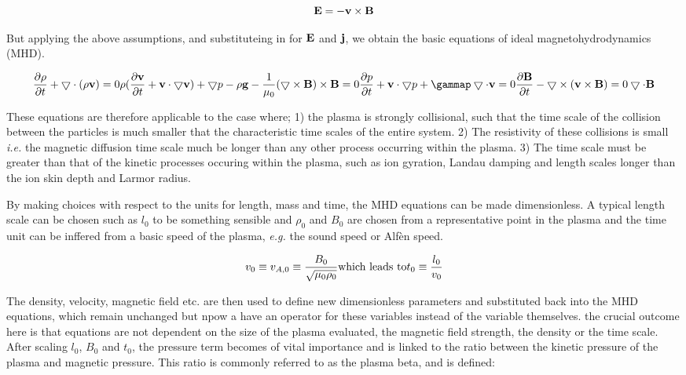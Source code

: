 \begin{equation}
	\mathbf{E} = -\mathbf{v} \times \mathbf{B}
\end{equation}

But applying the above assumptions, and substituteing in for $\mathbf{E}$ and $\mathbf{j}$, we obtain the basic equations of ideal magnetohydrodynamics (MHD).

\begin{equation}
	\pd{\rho}{t} + \del\cdot(\rho\mb{v}) = 0
	
	\rho(\pd{\mb{v}}{t} + \mb{v}\cdot\divv{\mb{v}}) + \divv{p} - \rho\mb{g} - \frac{1}{\mu_0}(\del \times \mb{B}) \times \mb{B} = 0
	
	\pd{p}{t} + \mb{v}\cdot\divv{p} + \gammap\del\cdot\mb{v} = 0
	
	\pd{\mb{B}}{t} - \del \times (\mb{v} \times \mb{B}) = 0
	
	\del\cdot\mb{B}
\end{equation}

These equations are therefore applicable to the case where; 1) the plasma is strongly collisional, such that the time scale of the collision between the particles is much smaller that the characteristic time scales of the entire system.
2) The resistivity of these collisions is small \emph{i.e.} the magnetic diffusion time scale much be longer than any other process occurring within the plasma.
3) The time scale must be greater than that of the kinetic processes occuring within the plasma, such as ion gyration, Landau damping and length scales longer than the ion skin depth and Larmor radius.

By making choices with respect to the units for length, mass and time, the MHD equations can be made dimensionless.
A typical length scale can be chosen such as $l_0$ to be something sensible and $\rho_0$ and $B_0$ are chosen from a representative point in the plasma and the time unit can be inffered from a basic speed of the plasma, \emph{e.g.} the sound speed or Alf{\`e}n speed.

\begin{equation}
	v_0 \equiv v_{A,0} \equiv \frac{B_0}{\sqrt{\mu_0\rho_0}} \textnormal{which leads to} t_0 \equiv \frac{l_0}{v_0} 
\end{equation}

The density, velocity, magnetic field etc. are then used to define new dimensionless parameters and substituted back into the MHD equations, which remain unchanged but npow a have an operator for these variables instead of the variable themselves.
the crucial outcome here is that equations are not dependent on the size of the plasma evaluated, the magnetic field strength, the density or the time scale.
After scaling $l_0$, $B_0$ and $t_0$, the pressure term becomes of vital importance and is linked to the ratio between the kinetic pressure of the plasma and magnetic pressure.
This ratio is commonly referred to as the plasma beta, and is defined:

